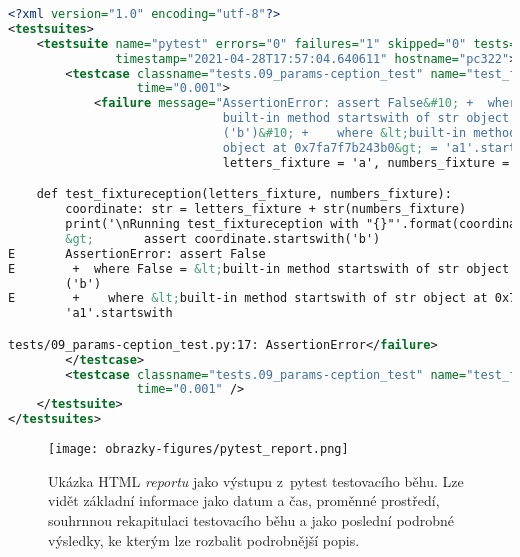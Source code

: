 \begin{lstlisting}[language=XML, basicstyle=\footnotesize\ttfamily, keepspaces=true, label={code:pytest_xml_report}, caption=Příklad XML \textit{reportu} testovacích výsledků. V~textu si lze všimnout základních informací o~testovací{,} běhu a~členění výsledků jednotlivých testů.]
<?xml version="1.0" encoding="utf-8"?>
<testsuites>
    <testsuite name="pytest" errors="0" failures="1" skipped="0" tests="2" time="0.079"
               timestamp="2021-04-28T17:57:04.640611" hostname="pc322">
        <testcase classname="tests.09_params-ception_test" name="test_fixtureception[a-1]"
                  time="0.001">
            <failure message="AssertionError: assert False&#10; +  where False = &lt;
                              built-in method startswith of str object at 0x7fa7f7b243b0&gt;
                              ('b')&#10; +    where &lt;built-in method startswith of str
                              object at 0x7fa7f7b243b0&gt; = 'a1'.startswith">
                              letters_fixture = 'a', numbers_fixture = 1

    def test_fixtureception(letters_fixture, numbers_fixture):
        coordinate: str = letters_fixture + str(numbers_fixture)
        print('\nRunning test_fixtureception with "{}"'.format(coordinate))
        &gt;       assert coordinate.startswith('b')
E       AssertionError: assert False
E        +  where False = &lt;built-in method startswith of str object at 0x7fa7f7b243b0&gt;
        ('b')
E        +    where &lt;built-in method startswith of str object at 0x7fa7f7b243b0&gt; =
        'a1'.startswith

tests/09_params-ception_test.py:17: AssertionError</failure>
        </testcase>
        <testcase classname="tests.09_params-ception_test" name="test_fixtureception[b-1]"
                  time="0.001" />
    </testsuite>
</testsuites>
\end{lstlisting}
\vspace{0.7em}

\begin{figure}[H]
	\centering
	\texttt{[image: obrazky-figures/pytest\_report.png]}
	\caption{Ukázka HTML \textit{reportu} jako výstupu z~pytest testovacího běhu. Lze vidět základní informace jako datum a čas, proměnné prostředí, souhrnnou rekapitulaci testovacího běhu a jako poslední podrobné výsledky, ke kterým lze rozbalit podrobnější popis.}
	\label{img:pytest_html_report}
\end{figure}


